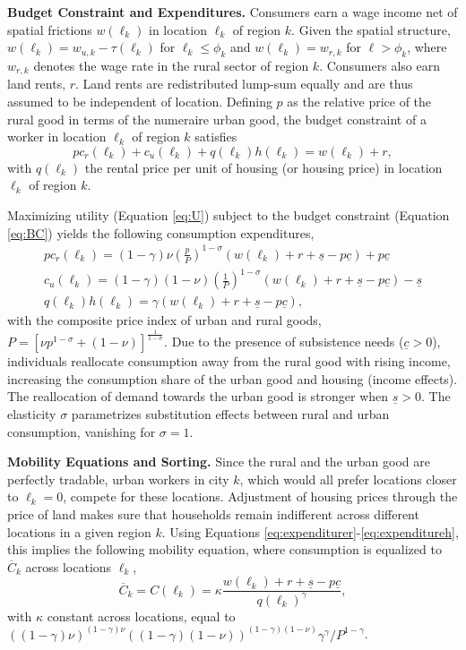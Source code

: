 \documentclass[20250130-paper.tex]{subfiles}
\begin{document}
\textbf{Budget Constraint and Expenditures.} Consumers earn a wage income net of spatial frictions  $w(\ell_k)$ in location $\ell_k$ of region $k$. Given the spatial structure, $w(\ell_k)=w_{u,k} - \tau(\ell_k)$ for $\ell_k \leq \phi_k$ and $w(\ell_k)=w_{r,k}$ for $\ell > \phi_k$, where $w_{r,k}$ denotes the wage rate in the rural sector of region $k$. Consumers also earn land rents, $r$. Land rents are redistributed lump-sum equally and are thus assumed to be independent of location. Defining $p$ as the relative price of the rural good in terms of the numeraire urban good, the budget constraint of a worker in location $\ell_k$ of region $k$ satisfies%
\begin{equation}
pc_r(\ell_k)+c_u(\ell_k)+q(\ell_k)h(\ell_k)=w(\ell_k)+r,  \label{eq:BC}
\end{equation}%
with $q(\ell_k)$ the rental price per unit of housing (or housing price) in location $\ell_k$ of region $k$.

Maximizing utility (Equation \eqref{eq:U}) subject to the budget constraint (Equation \eqref{eq:BC}) yields the following consumption expenditures,
\begin{eqnarray}
pc_r(\ell_k)=(1-\gamma)\nu\left(\frac{p}{P}\right)^{1-\sigma}(w(\ell_k)+r + \underline{s} -p\underline{c})+p\underline{c} \label{eq:expenditurer}\\
c_u(\ell_k)=(1-\gamma)\left( 1-\nu\right)\left(\frac{1}{P}\right)^{1-\sigma}  (w(\ell_k)+r + \underline{s} -p\underline{c}) - \underline{s} \label{eq:expenditureu} \\
q(\ell_k)h(\ell_k)=\gamma (w(\ell_k)+r+ \underline{s}-p\underline{c}), \label{eq:expenditureh}
\end{eqnarray}
with the composite price index of urban and rural goods, $
P=\left[ \nu p^{1-\sigma}+\left( 1-\nu\right)\right]^{\frac{1}{1-\sigma}}$.
Due to the presence of subsistence needs ($\underline{c}>0$), individuals reallocate consumption away from the rural good with rising income, increasing the consumption share of the urban good and housing (income effects). The reallocation of demand towards the urban good is stronger when $\underline{s}>0$. The elasticity $\sigma$ parametrizes substitution effects between rural and urban consumption, vanishing for $\sigma=1$.

\textbf{Mobility Equations and Sorting.} Since the rural and the urban good are perfectly tradable, urban workers in city $k$, which would all prefer locations closer to $\ell_k=0$, compete for these locations. Adjustment of housing prices through the price of land makes sure that households remain indifferent across different locations in a given region $k$. Using Equations \eqref{eq:expenditurer}-\eqref{eq:expenditureh}, this implies the following mobility equation, where consumption is equalized to $\overline{C}_k$ across locations $\ell_k$,
\begin{equation}
\overline{C}_k=C(\ell_k)=\kappa\frac{w(\ell_k)+r+ \underline{s}-p\underline{c}}{q(\ell_k)^{\gamma}}, \label{Eq:log-indiff}
\end{equation}
with $\kappa$ constant across locations, equal to $\left( (1-\gamma)\nu\right) ^{\left( 1-\gamma\right) \nu}\left( (1-\gamma)(1-\nu)\right) ^{\left( 1-\gamma\right) \left( 1-\nu\right) }\gamma^{\gamma}/P^{1-\gamma}$.
\end{document}
